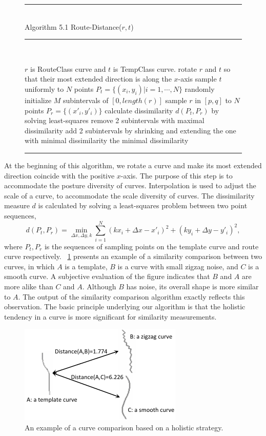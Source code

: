 \documentclass[journal]{IEEEtran}
\newenvironment{myalgorithm}[1]%
{\begin{figure}[!h]\small\noindent\rule{\linewidth}{1pt}\\#1\vspace{-0.5em}\\%
\rule{\linewidth}{0.5pt}\\\vspace{-1.5em}}%
{\vspace{-0.5em}\rule{\linewidth}{1pt}\end{figure}}
\begin{document}
\begin{myalgorithm}{Algorithm 5.1 Route-Distance($r,t$)}
\begin{algorithmic}[1]
\REQUIRE $r$ is RouteClass curve and $t$ is TempClass curve.
\STATE rotate $r$ and $t$ so that their most extended direction is along the $x$-axis
\STATE sample $t$ uniformly to $N$ points $P_t=\{(x_i,y_i)|i=1,\cdots,N\}$
\STATE randomly initialize $M$ subintervals of $[0,length(r)]$
\REPEAT
    \STATE sample $r$ in $[p,q]$ to $N$ points $P_r=\{(x'_i,y'_i)\}$
    \STATE calculate dissimilarity $d(P_t,P_r)$ by solving least-squares
  \ENDFOR
  \STATE remove 2 subintervals with maximal dissimilarity
  \STATE add 2 subintervals by shrinking and extending the one with minimal dissimilarity
\RETURN the minimal dissimilarity
\end{algorithmic}
\end{myalgorithm}

At the beginning of this algorithm, we rotate a curve and make its most extended direction coincide with the positive $x$-axis. 
The purpose of this step is to accommodate the posture diversity of curves. 
Interpolation is used to adjust the scale of a curve, to accommodate the scale diversity of curves. 
The dissimilarity measure $d$ is calculated by solving a least-squares problem between two point sequences,
\begin{equation}
d(P_t,P_r)=\min_{\Delta x,\Delta y,k}\sum_{i=1}^{N}(kx_i+\Delta x-x'_i)^2+(ky_i+\Delta y-y'_i)^2,
\end{equation}
where $P_t,P_r$ is the sequences of sampling points on the template curve and route curve respectively.
\figurename~\ref{fig:13} presents an example of a similarity comparison between two curves,
in which $A$ is a template, $B$ is a curve with small zigzag noise, and $C$ is a smooth curve. 
A subjective evaluation of the figure indicates that $B$ and $A$ are more alike than $C$ and $A$. 
Although $B$ has noise, its overall shape is more similar to $A$. 
The output of the similarity comparison algorithm exactly reflects this observation. 
The basic principle underlying our algorithm is that the holistic tendency in a curve is more significant for similarity measurements. 

\begin{figure}[!t]
\centering
\includegraphics[width=0.65\linewidth]{images/fig13.pdf}
\caption{An example of a curve comparison based on a holistic strategy.}
\label{fig:13}
\end{figure}
\end{document}
